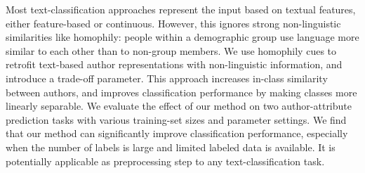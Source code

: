 Most text-classification approaches represent the input based on textual features, either feature-based or continuous. However, this ignores strong non-linguistic similarities like homophily: people within a demographic group use language more similar to each other than to non-group members. We use homophily cues to retrofit text-based author representations with non-linguistic information, and introduce a trade-off parameter. This approach increases in-class similarity between authors, and improves classification performance by making classes more linearly separable. We evaluate the effect of our method on two author-attribute prediction tasks with various training-set sizes and parameter settings. We find that our method can significantly improve classification performance, especially when the number of labels is large and limited labeled data is available. It is potentially applicable as preprocessing step to any text-classification task.
